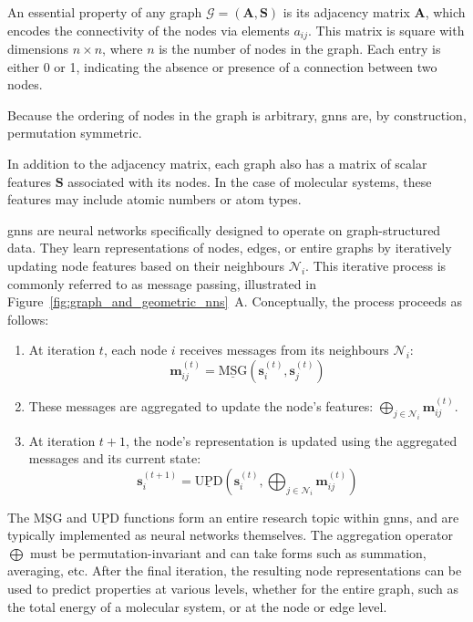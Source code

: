 An essential property of any graph $\mathcal{G} = (\mathbf{A}, \mathbf{S})$ is its adjacency matrix $\mathbf{A}$, which encodes the connectivity of the nodes via elements $a_{ij}$. This matrix is square with dimensions $n \times n$, where $n$ is the number of nodes in the graph. Each entry is either 0 or 1, indicating the absence or presence of a connection between two nodes.

Because the ordering of nodes in the graph is arbitrary, \acp{gnn} are, by construction, permutation symmetric.

In addition to the adjacency matrix, each graph also has a matrix of scalar features $\mathbf{S}$ associated with its nodes. In the case of molecular systems, these features may include atomic numbers or atom types.

\Acp{gnn} are neural networks specifically designed to operate on graph-structured data. They learn representations of nodes, edges, or entire graphs by iteratively updating node features based on their neighbours $\mathcal{N}_i$. This iterative process is commonly referred to as message passing, illustrated in Figure~\ref{fig:graph_and_geometric_nns}~A. Conceptually, the process proceeds as follows:
\begin{enumerate}
    \item At iteration $t$, each node $i$ receives messages from its neighbours $\mathcal{N}_i$:
    \begin{equation}
        \mathbf{m}_{ij}^{(t)} = \underline{\text{MSG}}\left(\mathbf{s}_i^{(t)}, \mathbf{s}_j^{(t)}\right)
        \label{eq:message_passing}
    \end{equation}

    \item These messages are aggregated to update the node's features: $\bigoplus_{j \in \mathcal{N}_i} \mathbf{m}_{ij}^{(t)}$.
        
    \item At iteration $t + 1$, the node's representation is updated using the aggregated messages and its current state:
    \begin{equation}
        \mathbf{s}_i^{(t+1)} = \underline{\text{UPD}}\left(\mathbf{s}_i^{(t)}, \bigoplus_{j \in \mathcal{N}_i} \mathbf{m}_{ij}^{(t)}\right)
        \label{eq:representation_update}
    \end{equation}
\end{enumerate}

The $\underline{\text{MSG}}$ and $\underline{\text{UPD}}$ functions form an entire research topic within \acp{gnn}, and are typically implemented as neural networks themselves. The aggregation operator $\bigoplus$ must be permutation-invariant and can take forms such as summation, averaging, etc. After the final iteration, the resulting node representations can be used to predict properties at various levels, whether for the entire graph, such as the total energy of a molecular system, or at the node or edge level.

